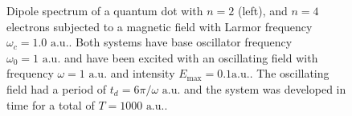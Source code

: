 \begin{figure}[!h]
    \centering
    \caption{Dipole spectrum of a quantum dot with $n=2$ (left), and $n=4$ electrons 
    subjected to a magnetic field with Larmor frequency $\omega_c=1.0 \text{ a.u.}$.
    Both systems have base oscillator frequency $\omega_0=1 \text{ a.u.}$ and 
    have been excited with an oscillating field with frequency $\omega = 1 \text{ a.u.}$
    and intensity $E_\text{max} = 0.1 \text{a.u.}$. The oscillating field had a period of 
    $t_d = 6\pi/\omega \text{ a.u.}$ and the system was developed in time for a total 
    of $T = 1000 \text{ a.u.}$.}
    \label{fig:b_omc100}
\end{figure}

\vfill
\pagebreak

\clearemptydoublepage
